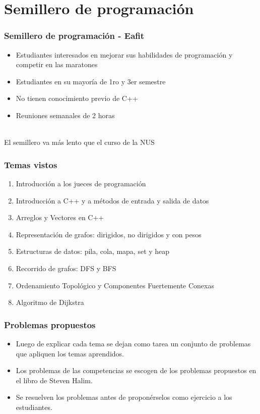 \documentclass{beamer}
\begin{document}
\section{Semillero de programación}
	\begin{frame}
		\frametitle{Semillero de programación - Eafit}
		\begin{itemize}
			\item Estudiantes interesados en mejorar sus habilidades de programación y competir en las maratones
			\item Estudiantes en su mayoría de 1ro y 3er semestre
			\item No tienen conocimiento previo de C++
			\item Reuniones semanales de 2 horas
		\end{itemize}
		
		\begin{center}
			\\
			\large{El semillero va más lento que el curso de la NUS} 
		\end{center}
	\end{frame}
	
	\begin{frame}
		\frametitle{Temas vistos}
		\begin{enumerate}
			\item{Introducción a los jueces de programación}
			\item{Introducción a C++ y a métodos de entrada y salida de datos}
			\item{Arreglos y Vectores en C++}
			\item{Representación de grafos: dirigidos, no dirigidos y con pesos}
			\item{Estructuras de datos: pila, cola, mapa, set y heap}
			\item{Recorrido de grafos: DFS y BFS}
			\item{Ordenamiento Topológico y Componentes Fuertemente Conexas}
			\item{Algoritmo de Dijkstra}
		\end{enumerate}
	\end{frame}
	
	\begin{frame}
		\frametitle{Problemas propuestos}
		\begin{itemize}	
			\item Luego de explicar cada tema se dejan como tarea un conjunto de problemas que apliquen los temas aprendidos.\\
			\item Los problemas de las competencias se escogen de los problemas propuestos en el libro de Steven Halim.\\
			\item Se resuelven los problemas antes de proponérselos como ejercicio a los estudiantes.
		
		\end{itemize}
	\end{frame}
	
\end{document}
